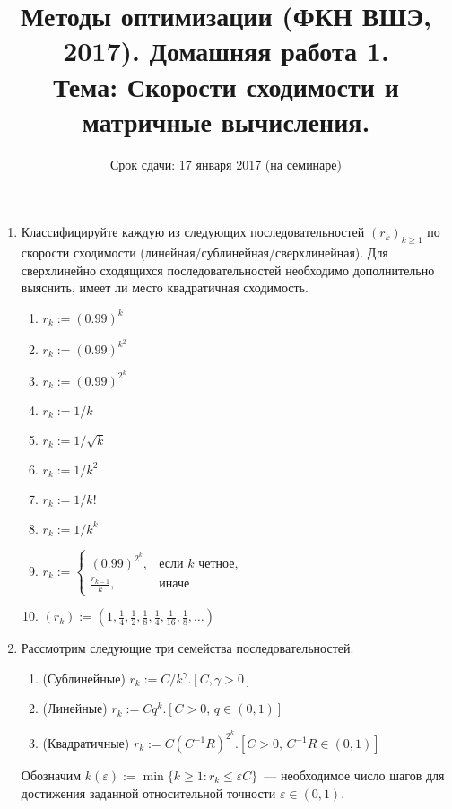 \documentclass{article}
\title{\vspace{-2em}Методы оптимизации (ФКН ВШЭ, 2017). Домашняя работа 1.\\Тема: Скорости сходимости и матричные вычисления.}
\author{Срок сдачи: 17 января 2017 (на семинаре)}
\date{}
\renewcommand{\epsilon}{\varepsilon} %
\begin{document}
\maketitle

\begin{enumerate}[label=\textbf{\arabic*}, leftmargin=0em]
\item Классифицируйте каждую из следующих последовательностей $(r_k)_{k \geq 1}$ по скорости сходимости (линейная/сублинейная/сверхлинейная). Для сверхлинейно сходящихся последовательностей необходимо дополнительно выяснить, имеет ли место квадратичная сходимость.
\begin{multicols}{3}
	\begin{enumerate}
		\item $r_k := (0.99)^k$
		\item $r_k := (0.99)^{k^2}$
		\item $r_k := (0.99)^{2^k}$
		\item $r_k := 1/k$
		\item $r_k := 1/\sqrt{k}$
		\item $r_k := 1/k^2$
		\item $r_k := 1/k!$
		\item $r_k := 1/k^k$
		\item $r_k := \begin{cases}
		\left(0.99\right)^{2^k}, & \text{если $k$ четное}, \\
		\frac{r_{k-1}}{k}, & \text{иначе}
		\end{cases}$
		\item $(r_k) := \left(1, \frac{1}{4}, \frac{1}{2}, \frac{1}{8}, \frac{1}{4}, \frac{1}{16}, \frac{1}{8}, \dots \right)$
	\end{enumerate}
\end{multicols}

\item Рассмотрим следующие три семейства последовательностей:
\begin{enumerate}[ref=(\alph*)]
	\item (Сублинейные) $r_k := C / k^{\gamma}$.\hfill$[C, \gamma > 0]$
	\item (Линейные) $r_k := C q^k$.\hfill$[C > 0, \, q \in (0, 1)]$
	\item (Квадратичные) $r_k := C (C^{-1} R)^{2^k}$.\hfill$[C > 0, \, C^{-1} R \in (0, 1)]$
\end{enumerate}
Обозначим $k(\epsilon) := \min\{ k \geq 1 : r_k \leq \epsilon C \}$~--- необходимое число шагов для достижения заданной относительной точности $\epsilon \in (0, 1)$.


\end{enumerate}
\end{document}
